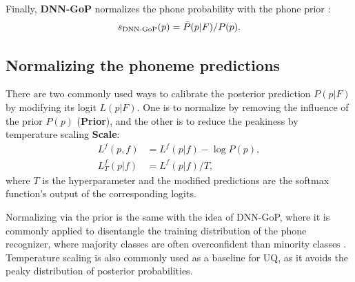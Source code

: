 Finally, \textbf{DNN-GoP} \cite{hu2015improved} normalizes the phone probability with the phone prior \cite{hong2021disentangling}:
\begin{align}
    s_\text{DNN-GoP}(p) = \Bar{P}(p|F) / P(p).
\end{align}






\subsection{Normalizing the phoneme predictions}\label{subsec:modify_pred}
There are two commonly used ways to calibrate the posterior prediction $P(p|F)$ by modifying its logit $L(p|F)$.
One is to normalize by removing the influence of the prior $P(p)$ \cite{hong2021disentangling,hu2015improved} (\textbf{Prior}), and the other is to reduce the peakiness by temperature scaling \cite{guo2017calibration} \textbf{Scale}:
\begin{align}
    L^f(p, f) &= L^f(p|f) - \log P(p), \\
    L^f_T(p|f) &= L^f(p|f) / T, 
\end{align}
where $T$ is the hyperparameter and the modified predictions are the softmax function's output of the corresponding logits.


Normalizing via the prior is the same with the idea of DNN-GoP, where it is commonly applied to disentangle the training distribution of the phone recognizer, where majority classes are often overconfident than minority classes \cite{hong2021disentangling}.
Temperature scaling is also commonly used as a baseline for UQ, as it avoids the peaky distribution of posterior probabilities.



